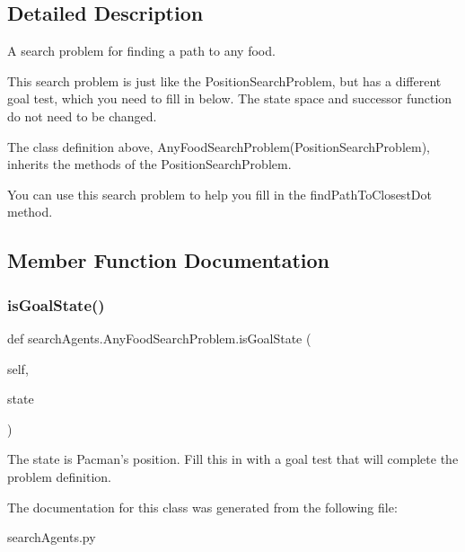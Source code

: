\subsection{Detailed Description}
\begin{DoxyVerb}  A search problem for finding a path to any food.

  This search problem is just like the PositionSearchProblem, but
  has a different goal test, which you need to fill in below.  The
  state space and successor function do not need to be changed.

  The class definition above, AnyFoodSearchProblem(PositionSearchProblem),
  inherits the methods of the PositionSearchProblem.

  You can use this search problem to help you fill in
  the findPathToClosestDot method.
\end{DoxyVerb}
 

\subsection{Member Function Documentation}
\mbox{\label{classsearch_agents_1_1_any_food_search_problem_a2b17e2e517592203930d4cc0ca29659a}} 
\subsubsection{\texorpdfstring{is\+Goal\+State()}{isGoalState()}}
{\footnotesize\ttfamily def search\+Agents.\+Any\+Food\+Search\+Problem.\+is\+Goal\+State (\begin{DoxyParamCaption}\item[{}]{self,  }\item[{}]{state }\end{DoxyParamCaption})}

\begin{DoxyVerb}The state is Pacman's position. Fill this in with a goal test
that will complete the problem definition.
\end{DoxyVerb}
 

The documentation for this class was generated from the following file\+:\begin{DoxyCompactItemize}
\item 
search\+Agents.\+py\end{DoxyCompactItemize}
